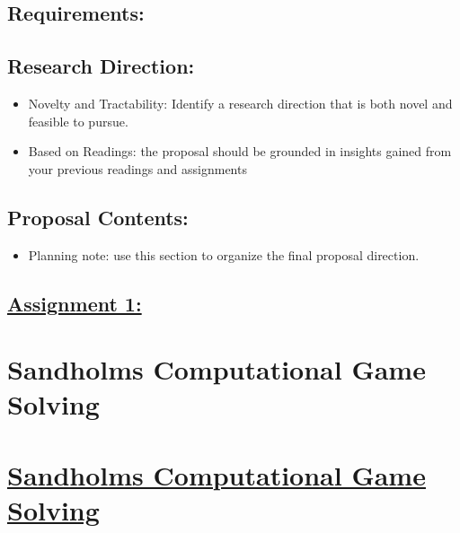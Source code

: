 \documentclass[
]{article}
\begin{document}
\subsection{\texorpdfstring{\textbf{Requirements:}}{Requirements:}}\label{requirements-2}

\subsection{Research Direction:}\label{research-direction}

\begin{itemize}
\item
  Novelty and Tractability: Identify a research direction that is both
  novel and feasible to pursue.
\item
  Based on Readings: the proposal should be grounded in insights gained
  from your previous readings and assignments
\end{itemize}

\subsection{Proposal Contents:}\label{proposal-contents}

\begin{itemize}
\item
  Planning note: use this section to organize the final proposal
  direction.
\end{itemize}

\subsection*{\texorpdfstring{\textbf{\ul{Assignment
1:}}}{Assignment 1:}}\label{assignment-1}

\section*{Sandholm\textquotesingle s Computational Game
Solving}\label{sandholms-computational-game-solving}

\section*{\texorpdfstring{\textbf{\ul{Sandholm\textquotesingle s
Computational Game
Solving}}}{Sandholm\textquotesingle s Computational Game Solving}}\label{sandholms-computational-game-solving-1}
\end{document}
